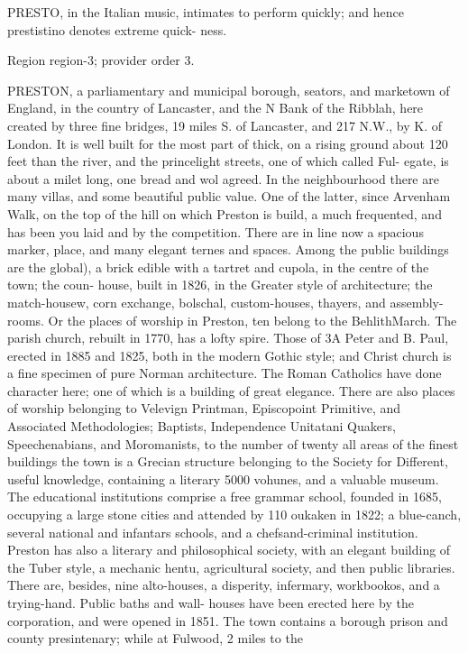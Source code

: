\documentclass[11pt]{article}
\begin{document}
PRESTO, in the Italian music, intimates to perform quickly; and hence prestistino denotes extreme quick-
ness.
\par

{\scriptsize\color{gray} Region region-3; provider order 3.\par}
\medskip

PRESTON, a parliamentary and municipal borough, seators, and marketown of England, in the country of Lancaster, and the N Bank of the Ribblah, here created by three fine bridges, 19 miles S. of Lancaster, and 217 N.W., by K. of London. It is well built for the most part of thick, on a rising ground about 120 feet than the river, and the princelight streets, one of which called Ful-
egate, is about a milet long, one bread and wol agreed. In the neighbourhood there are many villas, and some beautiful public value. One of the latter, since Arvenham Walk, on the top of the hill on which Preston is build, a much frequented, and has been you laid and by the competition. There are in line now a spacious marker, place, and many elegant ternes and spaces. Among the public buildings are the global), a brick edible with a tartret and cupola, in the centre of the town; the coun-
house, built in 1826, in the Greater style of architecture; the match-housew, corn exchange, bolschal, custom-houses, thayers, and assembly-rooms. Or the places of worship in Preston, ten belong to the BehlithMarch. The parish church, rebuilt in 1770, has a lofty spire. Those of 3A Peter and B. Paul, erected in 1885 and 1825, both in the modern Gothic style; and Christ church is a fine specimen of pure Norman architecture. The Roman Catholics have done character here; one of which is a building of great elegance. There are also places of worship belonging to Velevign Printman, Episcopoint Primitive, and Associated Methodologies; Baptists, Independence Unitatani Quakers, Speechenabians, and Moromanists, to the number of twenty all areas of the finest buildings the town is a Grecian structure belonging to the Society for Different, useful knowledge, containing a literary 5000 vohunes, and a valuable museum. The educational institutions comprise a free grammar school, founded in 1685, occupying a large stone cities and attended by 110 oukaken in 1822; a blue-canch, several national and infantars schools, and a chefsand-criminal institution. Preston has also a literary and philosophical society, with an elegant building of the Tuber style, a mechanic hentu, agricultural society, and then public libraries. There are, besides, nine alto-houses, a disperity, infermary, workbookos, and a trying-hand. Public baths and wall- houses have been erected here by the corporation, and were opened in 1851. The town contains a borough prison and county presintenary; while at Fulwood, 2 miles to the
\par
\end{document}
